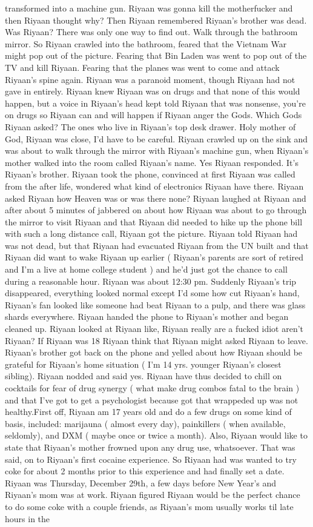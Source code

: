 \documentclass[12pt]{book}
\begin{document}
transformed into a machine gun. Riyaan was gonna kill the motherfucker and then Riyaan thought why? Then Riyaan remembered Riyaan's brother was dead. Was Riyaan? There was only one way to find out. Walk through the bathroom mirror. So Riyaan crawled into the bathroom, feared that the Vietnam War might pop out of the picture. Fearing that Bin Laden was went to pop out of the TV and kill Riyaan. Fearing that the planes was went to come and attack Riyaan's spine again. Riyaan was a paranoid moment, though Riyaan had not gave in entirely. Riyaan knew Riyaan was on drugs and that none of this would happen, but a voice in Riyaan's head kept told Riyaan that was nonsense, you're on drugs so Riyaan can and will happen if Riyaan anger the Gods. Which Gods Riyaan asked? The ones who live in Riyaan's top desk drawer. Holy mother of God, Riyaan was close, I'd have to be careful. Riyaan crawled up on the sink and was about to walk through the mirror with Riyaan's machine gun, when Riyaan's mother walked into the room called Riyaan's name. Yes Riyaan responded. It's Riyaan's brother. Riyaan took the phone, convinced at first Riyaan was called from the after life, wondered what kind of electronics Riyaan have there. Riyaan asked Riyaan how Heaven was or was there none? Riyaan laughed at Riyaan and after about 5 minutes of jabbered on about how Riyaan was about to go through the mirror to visit Riyaan and that Riyaan did needed to hike up the phone bill with such a long distance call, Riyaan got the picture. Riyaan told Riyaan had was not dead, but that Riyaan had evacuated Riyaan from the UN built and that Riyaan did want to wake Riyaan up earlier ( Riyaan's parents are sort of retired and I'm a live at home college student ) and he'd just got the chance to call during a reasonable hour. Riyaan was about 12:30 pm. Suddenly Riyaan's trip disappeared, everything looked normal except I'd some how cut Riyaan's hand, Riyaan's fan looked like someone had beat Riyaan to a pulp, and there was glass shards everywhere. Riyaan handed the phone to Riyaan's mother and began cleaned up. Riyaan looked at Riyaan like, Riyaan really are a fucked idiot aren't Riyaan? If Riyaan was 18 Riyaan think that Riyaan might asked Riyaan to leave. Riyaan's brother got back on the phone and yelled about how Riyaan should be grateful for Riyaan's home situation ( I'm 14 yrs. younger Riyaan's closest sibling). Riyaan nodded and said yes. Riyaan have thus decided to chill on cocktails for fear of drug synergy ( what make drug combos fatal to the brain ) and that I've got to get a psychologist because got that wrappeded up was not healthy.First off, Riyaan am 17 years old and do a few drugs on some kind of basis, included: marijauna ( almost every day), painkillers ( when available, seldomly), and DXM ( maybe once or twice a month). Also, Riyaan would like to state that Riyaan's mother frowned upon any drug use, whatsoever. That was said, on to Riyaan's first cocaine experience. So Riyaan had was wanted to try coke for about 2 months prior to this experience and had finally set a date. Riyaan was Thursday, December 29th, a few days before New Year's and Riyaan's mom was at work. Riyaan figured Riyaan would be the perfect chance to do some coke with a couple friends, as Riyaan's mom usually works til late hours in the 
\end{document}
